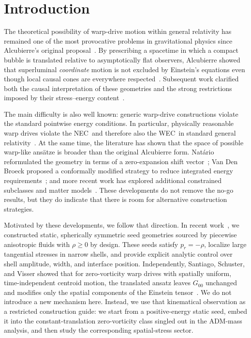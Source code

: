 \documentclass[11pt]{article}
\makeatletter
\newcommand{\@abbr}[1]{\ifmmode\mathrm{#1}\else\textsc{#1}\fi}
\newcommand{\WEC}{\@abbr{WEC}}
\newcommand{\NEC}{\@abbr{NEC}}
\makeatother
\begin{document}
\section{Introduction}
\label{sec:intro}
The theoretical possibility of warp-drive motion within general relativity has remained one of the most provocative problems in gravitational physics since Alcubierre's original proposal~\cite{Alcubierre:1994tu}. By prescribing a spacetime in which a compact bubble is translated relative to asymptotically flat observers, Alcubierre showed that superluminal \emph{coordinate} motion is not excluded by Einstein's equations even though local causal cones are everywhere respected~\cite{Alcubierre:1994tu,Clark:1999zn,Everett:1995nn}. Subsequent work clarified both the causal interpretation of these geometries and the strong restrictions imposed by their stress--energy content~\cite{Pfenning:1997,Olum:1998mu,Low:1998uy,Lobo:2004wq}.

The main difficulty is also well known: generic warp-drive constructions violate the standard pointwise energy conditions. In particular, physically reasonable warp drives violate the \NEC\ and therefore also the \WEC\ in standard general relativity~\cite{Olum:1998mu,Santiago:2021aup}. At the same time, the literature has shown that the space of possible warp-like ans\"atze is broader than the original Alcubierre form. Nat\'ario reformulated the geometry in terms of a zero-expansion shift vector~\cite{Natario:2001}; Van Den Broeck proposed a conformally modified strategy to reduce integrated energy requirements~\cite{VanDenBroeck:1999}; and more recent work has explored additional constrained subclasses and matter models~\cite{Krasnikov:1998,Bobrick:2021,Lentz:2020euv}. These developments do not remove the no-go results, but they do indicate that there is room for alternative construction strategies.

Motivated by these developments, we follow that direction. In recent work~\cite{Bolivar:2025a}, we constructed static, spherically symmetric seed geometries sourced by piecewise anisotropic fluids with $\rho\ge 0$ by design. These seeds satisfy $p_r=-\rho$, localize large tangential stresses in narrow shells, and provide explicit analytic control over shell amplitude, width, and interface position. Independently, Santiago, Schuster, and Visser showed that for zero-vorticity warp drives with spatially uniform, time-independent centroid motion, the translated ansatz leaves $G_{00}$ unchanged and modifies only the spatial components of the Einstein tensor~\cite{Santiago:2021aup,Schuster:2023ADMmass}. We do not introduce a new mechanism here. Instead, we use that kinematical observation as a restricted construction guide: we start from a positive-energy static seed, embed it into the constant-translation zero-vorticity class singled out in the ADM-mass analysis, and then study the corresponding spatial-stress sector.
\end{document}
